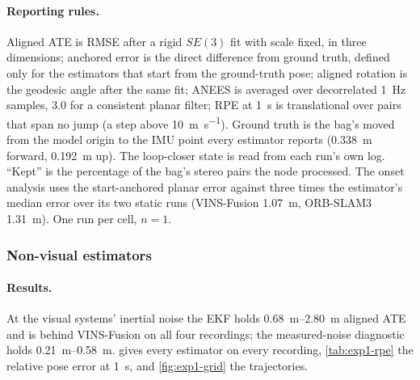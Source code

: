 \documentclass[11pt,a4paper,notitlepage]{report}
\begin{document}
\paragraph{Reporting rules.} Aligned ATE is RMSE after a rigid $SE(3)$ fit
with scale fixed, in three dimensions; anchored error is the direct difference
from ground truth, defined only for the estimators that start from the
ground-truth pose; aligned rotation is the geodesic angle after the same fit;
ANEES is averaged over decorrelated \SI{1}{\hertz} samples, 3.0 for a
consistent planar filter; RPE at \SI{1}{\second} is translational over pairs
that span no jump (a step above \SI{10}{\metre\per\second}). Ground truth is
the bag's  moved from the model origin to the IMU
point every estimator reports (\SI{0.338}{\metre} forward, \SI{0.192}{\metre}
up). The loop-closer state is read from each run's own log. ``Kept'' is the percentage of the bag's
stereo pairs the node processed. The onset analysis uses the start-anchored planar error against
three times the estimator's median error over its two static runs
(VINS-Fusion \SI{1.07}{\metre}, ORB-SLAM3 \SI{1.31}{\metre}). One run per cell,
$n=1$.

\subsubsection{Non-visual estimators}

\paragraph{Results.} At the visual systems' inertial noise the EKF holds
\SIrange{0.68}{2.80}{\metre} aligned ATE and is behind VINS-Fusion on all four
recordings; the measured-noise diagnostic holds \SIrange{0.21}{0.58}{\metre}.
 gives every estimator on every recording,
\cref{tab:exp1-rpe} the relative pose error at \SI{1}{\second}, and
\cref{fig:exp1-grid} the trajectories.
\end{document}
